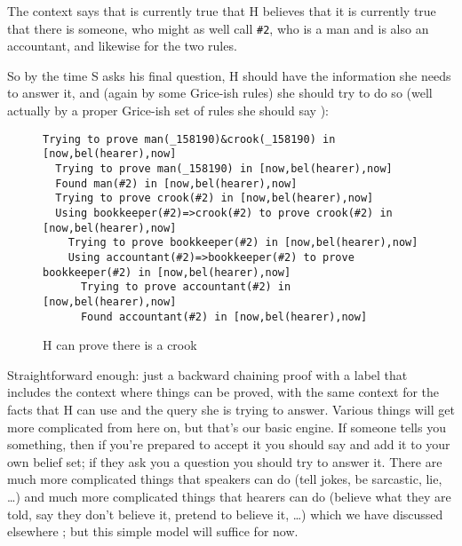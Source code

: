 \documentclass[11pt,a4paper]{article}
\begin{document}
\noindent
The context says that is currently true that H believes that it is
currently true that there is someone, who might as well call
\texttt{\#2}, who is a man and is also an accountant, and likewise for
the two rules.

So by the time S asks his final question, H
should have the information she needs to answer it, and (again by some
Grice-ish rules) she should try to do so (well actually by a proper
Grice-ish set of rules she should say ): 


\begin{figure}[ht]
\begin{center}
\begin{minipage}[t]{\linewidth}
\begin{Verbatim}[commandchars=\\\{\}]
Trying to prove man(_158190)&crook(_158190) in [now,bel(hearer),now]
  Trying to prove man(_158190) in [now,bel(hearer),now]
  Found man(#2) in [now,bel(hearer),now]
  Trying to prove crook(#2) in [now,bel(hearer),now]
  Using bookkeeper(#2)=>crook(#2) to prove crook(#2) in [now,bel(hearer),now]
    Trying to prove bookkeeper(#2) in [now,bel(hearer),now]
    Using accountant(#2)=>bookkeeper(#2) to prove bookkeeper(#2) in [now,bel(hearer),now]
      Trying to prove accountant(#2) in [now,bel(hearer),now]
      Found accountant(#2) in [now,bel(hearer),now]
\end{Verbatim}
\end{minipage}
\end{center}
\caption{H can prove there is a crook}\label{FIG:PROOF:1:a}
\end{figure}

\noindent
Straightforward enough: just a backward chaining proof with a label
that includes the context where things can be proved, with the same
context for the facts that H can use and the query she is trying to
answer. Various things will get more complicated from here on, but
that's our basic engine. If someone tells you something, then if
you're prepared to accept it you should say  and add it to your
own belief set; if they ask you a question you should try to answer
it. There are much more complicated things that speakers can do (tell
jokes, be sarcastic, lie, \ldots) and much more complicated things
that hearers can do (believe what they are told, say they don't
believe it, pretend to believe it, \ldots) which we have discussed
elsewhere \citep{Ramsay:06a,Ramsay:06b,Ramsay:08a,Ramsay:09b}; but
this simple model will suffice for now.
\end{document}
